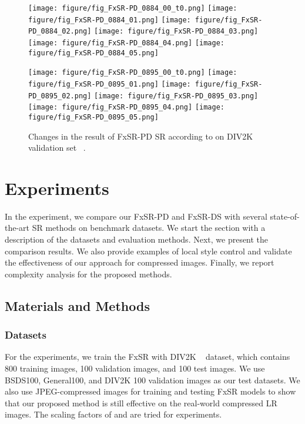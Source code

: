 \documentclass{article}
\begin{document}
\begin{figure*}[!t]
\begin{minipage}[t]{1.0\linewidth}
    \texttt{[image: figure/fig\_FxSR-PD\_0884\_00\_t0.png]}\hfill
    \texttt{[image: figure/fig\_FxSR-PD\_0884\_01.png]}\hfill
    \texttt{[image: figure/fig\_FxSR-PD\_0884\_02.png]}\hfill
    \texttt{[image: figure/fig\_FxSR-PD\_0884\_03.png]}\hfill
    \texttt{[image: figure/fig\_FxSR-PD\_0884\_04.png]}\hfill
    \texttt{[image: figure/fig\_FxSR-PD\_0884\_05.png]}\vfill
    \vspace{0.3cm}
    
    \texttt{[image: figure/fig\_FxSR-PD\_0895\_00\_t0.png]}\hfill
    \texttt{[image: figure/fig\_FxSR-PD\_0895\_01.png]}\hfill
    \texttt{[image: figure/fig\_FxSR-PD\_0895\_02.png]}\hfill
    \texttt{[image: figure/fig\_FxSR-PD\_0895\_03.png]}\hfill
    \texttt{[image: figure/fig\_FxSR-PD\_0895\_04.png]}\hfill
    \texttt{[image: figure/fig\_FxSR-PD\_0895\_05.png]}\vfill
    
\end{minipage}
\caption{Changes in the result of FxSR-PD  SR according to  on DIV2K validation set~\cite{agustsson2017ntire} .}
\label{fig:fig_FxSR-PD_t}
\end{figure*}

\section{Experiments}
In the experiment, we compare our FxSR-PD and FxSR-DS with several state-of-the-art SR methods on benchmark datasets. We start the section with a description of the datasets and evaluation methods. Next, we present the comparison results. We also provide examples of local style control and validate the effectiveness of our approach for compressed images. Finally, we report complexity analysis for the proposed methods.


\subsection{Materials and Methods} 

\subsubsection{Datasets}
For the experiments, we train the FxSR with DIV2K ~\cite{agustsson2017ntire} dataset, which contains 800 training images, 100 validation images, and 100 test images. We use BSDS100, General100, and DIV2K 100 validation images as our test datasets. We also use JPEG-compressed images for training and testing FxSR models to show that our proposed method is still effective on the real-world compressed LR images. The scaling factors of  and  are tried for experiments.
\end{document}
